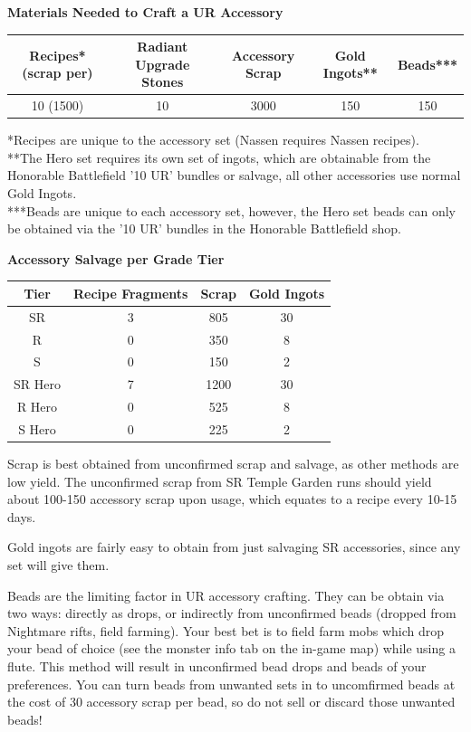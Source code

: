 \documentclass[]{article}
\begin{document}
\begin{center}
	\textbf{Materials Needed to Craft a UR Accessory}\\
	\begin{tabular}{|c|c|c|c|c|}
		\hline 
		Recipes* (scrap per) & Radiant Upgrade Stones & Accessory Scrap & Gold Ingots** & Beads*** \\ 
		\hline 
		10 (1500) & 10 & 3000 & 150 & 150 \\ 
		\hline 
	\end{tabular} 

\end{center}
*Recipes are unique to the accessory set (Nassen requires Nassen recipes).\\
**The Hero set requires its own set of ingots, which are obtainable from the Honorable Battlefield '10 UR' bundles or salvage, all other accessories use normal Gold Ingots.\\
***Beads are unique to each accessory set, however, the Hero set beads can only be obtained via the '10 UR' bundles in the Honorable Battlefield shop.\\

\begin{center}
	\textbf{Accessory Salvage per Grade Tier}\\
	\begin{tabular}{|c|c|c|c|}
		\hline 
		Tier & Recipe Fragments & Scrap & Gold Ingots \\ 
		\hline 
		SR & 3 & 805 & 30 \\ 
		R & 0 & 350 & 8 \\ 
		S & 0 & 150 & 2 \\ 
		SR Hero & 7 & 1200 & 30 \\
		R Hero & 0 & 525 & 8 \\
		S Hero & 0 & 225& 2 \\
		\hline
	\end{tabular}  
\end{center}

Scrap is best obtained from unconfirmed scrap and salvage, as other methods are low yield.
The unconfirmed scrap from SR Temple Garden runs should yield about 100-150 accessory scrap upon usage, which equates to a recipe every 10-15 days.

Gold ingots are fairly easy to obtain from just salvaging SR accessories, since any set will give them.

Beads are the limiting factor in UR accessory crafting.
They can be obtain via two ways: directly as drops, or indirectly from unconfirmed beads (dropped from Nightmare rifts, field farming).
Your best bet is to field farm mobs which drop your bead of choice (see the monster info tab on the in-game map) while using a flute.
This method will result in unconfirmed bead drops and beads of your preferences.
You can turn beads from unwanted sets in to uncomfirmed beads at the cost of 30 accessory scrap per bead, so do not sell or discard those unwanted beads!
\end{document}
